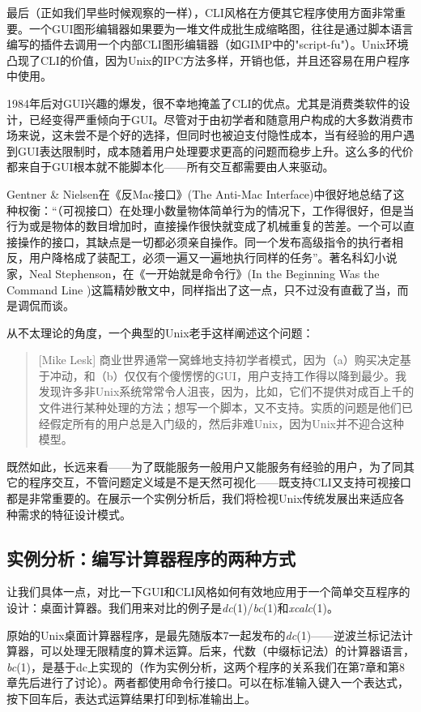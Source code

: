 \documentclass[12pt,oneside]{book}
\begin{document}
\begin{common-format}
最后（正如我们早些时候观察的一样），CLI风格在方便其它程序使用方面非常重要。一个GUI图形编辑器如果要为一堆文件成批生成缩略图，往往是通过脚本语言编写的插件去调用一个内部CLI图形编辑器（如GIMP中的"script-fu"）。Unix环境凸现了CLI的价值，因为Unix的IPC方法多样，开销也低，并且还容易在用户程序中使用。

1984年后对GUI兴趣的爆发，很不幸地掩盖了CLI的优点。尤其是消费类软件的设计，已经变得严重倾向于GUI。尽管对于由初学者和随意用户构成的大多数消费市场来说，这未尝不是个好的选择，但同时也被迫支付隐性成本，当有经验的用户遇到GUI表达限制时，成本随着用户处理要求更高的问题而稳步上升。这么多的代价都来自于GUI根本就不能脚本化——所有交互都需要由人来驱动。

Gentner \&{} Nielsen在《反Mac接口》(The Anti-Mac Interface)\cite{Gentner-Nielsen}中很好地总结了这种权衡：“（可视接口）在处理小数量物体简单行为的情况下，工作得很好，但是当行为或是物体的数目增加时，直接操作很快就变成了机械重复的苦差。一个可以直接操作的接口，其缺点是一切都必须亲自操作。同一个发布高级指令的执行者相反，用户降格成了装配工，必须一遍又一遍地执行同样的任务”。著名科幻小说家，Neal Stephenson，在《一开始就是命令行》(In the Beginning Was the Command Line \cite{Stephenson})这篇精妙散文中，同样指出了这一点，只不过没有直截了当，而是调侃而谈。

从不太理论的角度，一个典型的Unix老手这样阐述这个问题：
\begin{quote}[Mike Lesk]
商业世界通常一窝蜂地支持初学者模式，因为（a）购买决定基于冲动，和（b）仅仅有个傻愣愣的GUI，用户支持工作得以降到最少。我发现许多非Unix系统常常令人沮丧，因为，比如，它们不提供对成百上千的文件进行某种处理的方法；想写一个脚本，又不支持。实质的问题是他们已经假定所有的用户总是入门级的，然后非难Unix，因为Unix并不迎合这种模型。
\end{quote}

既然如此，长远来看——为了既能服务一般用户又能服务有经验的用户，为了同其它的程序交互，不管问题定义域是不是天然可视化——既支持CLI又支持可视接口都是非常重要的。在展示一个实例分析后，我们将检视Unix传统发展出来适应各种需求的特征设计模式。

\subsection{实例分析：编写计算器程序的两种方式}
让我们具体一点，对比一下GUI和CLI风格如何有效地应用于一个简单交互程序的设计：桌面计算器。我们用来对比的例子是\textit{dc}(1)/\textit{bc}(1)和\textit{xcalc}(1)。

原始的Unix桌面计算器程序，是最先随版本7一起发布的\textit{dc}(1)——逆波兰标记法计算器，可以处理无限精度的算术运算。后来，代数（中缀标记法）的计算器语言，\textit{bc}(1)，是基于dc上实现的（作为实例分析，这两个程序的关系我们在第7章和第8章先后进行了讨论）。两者都使用命令行接口。可以在标准输入键入一个表达式，按下回车后，表达式运算结果打印到标准输出上。


\end{common-format}
\end{document}
